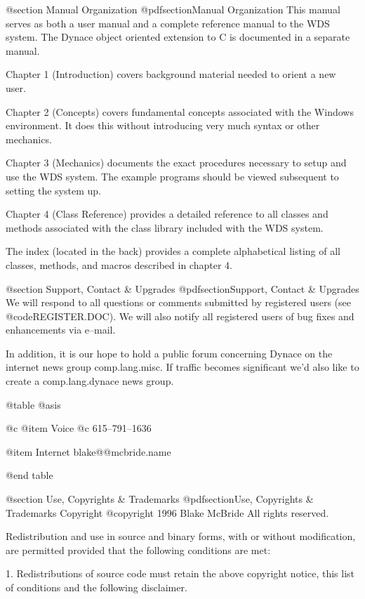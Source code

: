 @section Manual Organization
@pdfsection{Manual Organization}
This manual serves as both a user manual and a complete reference manual
to the WDS  system.  The Dynace object oriented extension to C is documented
in a separate manual. 

Chapter 1 (Introduction) covers background material needed to orient
a new user.

Chapter 2 (Concepts) covers fundamental concepts associated with the
Windows environment.  It does this without introducing very much syntax
or other mechanics.

Chapter 3 (Mechanics) documents the exact procedures necessary to setup
and use the WDS system.  The example programs should be viewed subsequent
to setting the system up.

Chapter 4 (Class Reference)  provides a detailed reference to all
classes and methods associated with the class library included
with the WDS system.

The index (located in the back) provides a complete alphabetical listing
of all classes, methods, and macros described in chapter 4.








@section Support, Contact & Upgrades
@pdfsection{Support, Contact & Upgrades}
We will respond to all questions or comments submitted by registered
users (see @code{REGISTER.DOC}).  We will also notify all registered
users of bug fixes and enhancements via e--mail.

In addition, it is our hope to hold a public forum concerning Dynace on
the internet news group comp.lang.misc.  If traffic becomes significant
we'd also like to create a comp.lang.dynace news group.

@table @asis

@c @item Voice
@c 615--791--1636

@item Internet
blake@@mcbride.name

@end table




@section Use, Copyrights & Trademarks
@pdfsection{Use, Copyrights & Trademarks}
Copyright  @copyright{} 1996 Blake McBride
All rights reserved.

Redistribution and use in source and binary forms, with or without
modification, are permitted provided that the following conditions are
met:

1. Redistributions of source code must retain the above copyright
notice, this list of conditions and the following disclaimer.

